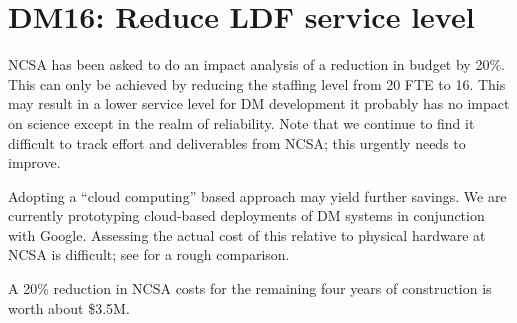 \section{DM16: Reduce LDF service level}\label{sect:dm16}

NCSA has been  asked to do an impact analysis of a reduction in budget by 20\%.
This can only be achieved by reducing the staffing level from 20 FTE to 16.
This may result in a lower service level for DM development it probably has no impact on science except in the realm of reliability.
Note that we continue to find it difficult to track effort and deliverables from NCSA; this urgently needs to improve.

Adopting a ``cloud computing'' based approach may yield further savings.
We are currently prototyping cloud-based deployments of DM systems in conjunction with Google.
Assessing the actual cost of this relative to physical hardware at NCSA is difficult; see  for a rough comparison.

A 20\% reduction in NCSA costs for the remaining four years of construction is worth about \$3.5M.
